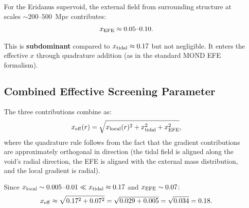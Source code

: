 \documentclass[11pt,a4paper]{article}
\begin{document}
For the Eridanus supervoid, the external field from surrounding
structure at scales $\sim 200$--$500$~Mpc contributes:
\begin{equation}
x_{\rm EFE} \approx 0.05\text{--}0.10.
\end{equation}

This is \textbf{subdominant} compared to $x_{\rm tidal} \approx 0.17$
but not negligible. It enters the effective $x$ through quadrature
addition (as in the standard MOND EFE formalism).


\subsection{Combined Effective Screening Parameter}

The three contributions combine as:
\begin{equation}
x_{\rm eff}(r) = \sqrt{x_{\rm local}(r)^2 + x_{\rm tidal}^2
+ x_{\rm EFE}^2},
\label{eq:x-eff-combined}
\end{equation}
where the quadrature rule follows from the fact that the gradient
contributions are approximately orthogonal in direction (the tidal
field is aligned along the void's radial direction, the EFE is
aligned with the external mass distribution, and the local gradient
is radial).

Since $x_{\rm local} \sim 0.005$--$0.01 \ll x_{\rm tidal}
\approx 0.17$ and $x_{\rm EFE} \sim 0.07$:
\begin{equation}
x_{\rm eff} \approx \sqrt{0.17^2 + 0.07^2} = \sqrt{0.029 + 0.005}
= \sqrt{0.034} = 0.18.
\label{eq:x-eff-value}
\end{equation}
\end{document}
